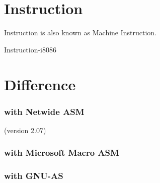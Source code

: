 
\section{Instruction}

Instruction is also known as {Machine Instruction}.

{Instruction-i8086}

\section{Difference}

\subsubsection{with Netwide ASM} (version 2.07)


\subsubsection{with Microsoft Macro ASM}


\subsubsection{with GNU-AS}

